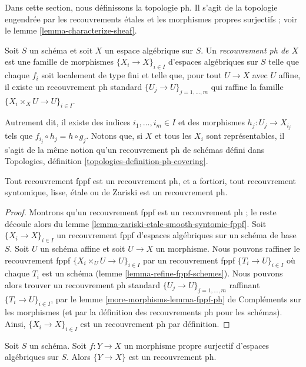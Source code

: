 \noindent
Dans cette section, nous définissons la topologie ph. Il s'agit de la topologie
engendrée par les recouvrements \'etales et les morphismes propres surjectifs ; voir
le lemme \ref{lemma-characterize-sheaf}.

\begin{definition}
\label{definition-ph-covering}
Soit $S$ un schéma et soit $X$ un espace algébrique sur $S$.
Un {\it recouvrement ph de $X$} est une famille
de morphismes $\{X_i \to X\}_{i \in I}$ d'espaces algébriques sur $S$
telle que chaque $f_i$ soit localement de type fini et telle que, pour tout
$U \to X$ avec $U$ affine, il existe un recouvrement ph standard
$\{U_j \to U\}_{j = 1, \ldots, m}$ qui raffine la famille
$\{X_i \times_X U \to U\}_{i \in I}$.
\end{definition}

\noindent
Autrement dit, il existe des indices $i_1, \ldots, i_m \in I$ et des
morphismes $h_j : U_j \to X_{i_j}$ tels que
$f_{i_j} \circ h_j = h \circ g_j$. Notons que, si $X$ et tous les $X_i$ sont
représentables, il s'agit de la même notion qu'un recouvrement ph de schémas défini dans
Topologies, définition \ref{topologies-definition-ph-covering}.

\begin{lemma}
\label{lemma-zariski-etale-smooth-syntomic-fppf-ph}
Tout recouvrement fppf est un recouvrement ph, et a fortiori,
tout recouvrement syntomique, lisse, \'etale ou de Zariski est un recouvrement ph.
\end{lemma}

\begin{proof}
Montrons qu'un recouvrement fppf est un recouvrement ph ; le
reste découle alors du lemme \ref{lemma-zariski-etale-smooth-syntomic-fppf}.
Soit $\{X_i \to X\}_{i \in I}$ un recouvrement fppf d'espaces algébriques
sur un schéma de base $S$. Soit $U$ un schéma affine et soit
$U \to X$ un morphisme. Nous pouvons raffiner le recouvrement fppf
$\{X_i \times_U U \to U\}_{i \in I}$ par un recouvrement fppf
$\{T_i \to U\}_{i \in I}$ où chaque $T_i$ est un schéma
(lemme \ref{lemma-refine-fppf-schemes}).
Nous pouvons alors trouver un recouvrement ph standard $\{U_j \to U\}_{j = 1, \ldots, m}$
raffinant $\{T_i \to U\}_{i \in I}$, par le
lemme \ref{more-morphisms-lemma-fppf-ph} de Compléments sur les morphismes
(et par la définition des recouvrements ph pour les schémas).
Ainsi, $\{X_i \to X\}_{i \in I}$ est un recouvrement ph par définition.
\end{proof}

\begin{lemma}
\label{lemma-surjective-proper-ph}
Soit $S$ un schéma. Soit $f : Y \to X$ un morphisme propre surjectif
d'espaces algébriques sur $S$. Alors $\{Y \to X\}$ est un recouvrement ph.
\end{lemma}

